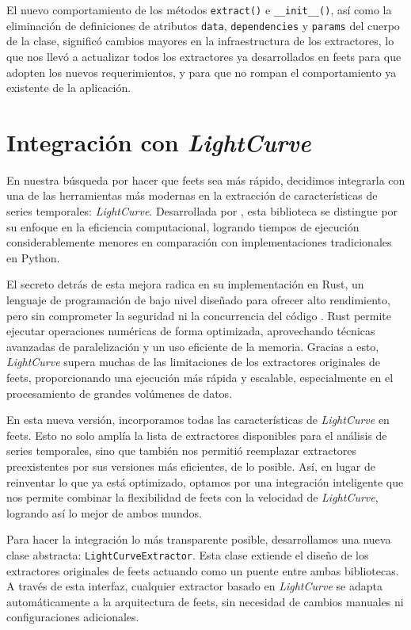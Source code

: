 El nuevo comportamiento de los métodos \texttt{extract()} e \texttt{\_\_init\_\_()}, así como la eliminación de definiciones de atributos \texttt{data}, \texttt{dependencies} y \texttt{params} del cuerpo de la clase, significó cambios mayores en la infraestructura de los extractores, lo que nos llevó a actualizar todos los extractores ya desarrollados en \gls{feets} para que adopten los nuevos requerimientos, y para que no rompan el comportamiento ya existente de la aplicación.

\section{Integración con \emph{LightCurve}}

En nuestra búsqueda por hacer que \gls{feets} sea más rápido, decidimos integrarla con una de las herramientas más modernas en la extracción de características de series temporales: \emph{LightCurve}. Desarrollada por \citet{malanchev2021lightcurve}, esta biblioteca se distingue por su enfoque en la eficiencia computacional, logrando tiempos de ejecución considerablemente menores en comparación con implementaciones tradicionales en Python. 

El secreto detrás de esta mejora radica en su implementación en Rust, un lenguaje de programación de bajo nivel diseñado para ofrecer alto rendimiento, pero sin comprometer la seguridad ni la concurrencia del código \citep{matsakis2014rust}. Rust permite ejecutar operaciones numéricas de forma optimizada, aprovechando técnicas avanzadas de paralelización y un uso eficiente de la memoria. Gracias a esto, \emph{LightCurve} supera muchas de las limitaciones de los extractores originales de \gls{feets}, proporcionando una ejecución más rápida y escalable, especialmente en el procesamiento de grandes volúmenes de datos.

En esta nueva versión, incorporamos todas las características de \emph{LightCurve} en \gls{feets}. Esto no solo amplía la lista de extractores disponibles para el análisis de series temporales, sino que también nos permitió reemplazar extractores preexistentes por sus versiones más eficientes, de lo posible. Así, en lugar de reinventar lo que ya está optimizado, optamos por una integración inteligente que nos permite combinar la flexibilidad de \gls{feets} con la velocidad de \emph{LightCurve}, logrando así lo mejor de ambos mundos.

Para hacer la integración lo más transparente posible, desarrollamos una nueva clase abstracta: \texttt{LightCurveExtractor}. Esta clase extiende el diseño de los extractores originales de \gls{feets} actuando como un puente entre ambas bibliotecas. A través de esta interfaz, cualquier extractor basado en \emph{LightCurve} se adapta automáticamente a la arquitectura de \gls{feets}, sin necesidad de cambios manuales ni configuraciones adicionales.

